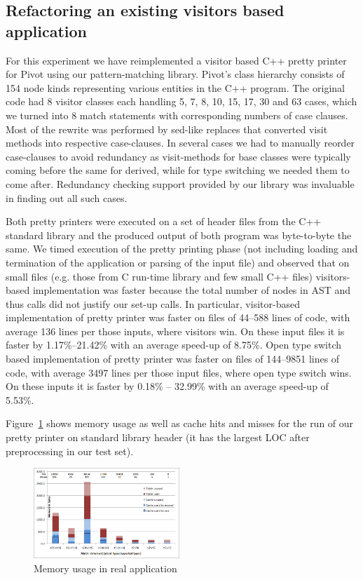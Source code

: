\subsection{Refactoring an existing visitors based application}
\label{sec:qualcmp}

For this experiment we have reimplemented a visitor based C++ pretty printer for 
Pivot\cite{Pivot09} using our pattern-matching library. Pivot's class hierarchy 
consists of 154 node kinds representing various entities in the C++ program. The 
original code had 8 visitor classes each handling 5, 7, 8, 10, 15, 17, 30 and 63 
cases, which we turned into 8 match statements with corresponding numbers of 
case clauses. Most of the rewrite was performed by sed-like replaces that 
converted visit methods into respective case-clauses. In several cases we had to 
manually reorder case-clauses to avoid redundancy as visit-methods for base classes 
were typically coming before the same for derived, while for type switching we 
needed them to come after. Redundancy checking support provided by our library 
was invaluable in finding out all such cases.

Both pretty printers were executed on a set of header files from the C++ 
standard library and the produced output of both program was byte-to-byte the same. 
We timed execution of the pretty printing phase (not including loading and termination 
of the application or parsing of the input file) and observed that on small 
files (e.g. those from C run-time library and few small C++ files) 
visitors-based implementation was faster because the total number of nodes in 
AST and thus calls did not justify our set-up calls. In particular, 
visitor-based implementation of pretty printer was faster on files of 44--588  
lines of code, with average 136 lines per those inputs, where visitors win. On 
these input files it is faster by 1.17\%--21.42\% with an average speed-up of 
8.75\%. Open type switch based implementation of pretty printer was faster on 
files of 144--9851 lines of code, with average 3497 lines per those input files, 
where open type switch wins. On these inputs it is faster by 0.18\% -- 32.99\% 
with an average speed-up of 5.53\%.

Figure~\ref{fig:mem} shows memory usage as well as cache hits and misses for 
the run of our pretty printer on  standard library 
header (it has the largest LOC after preprocessing in our test set).

\begin{figure}[htbp]
  \centering
    \includegraphics[width=0.49\textwidth]{Memory.png}
  \caption{Memory usage in real application}
  \label{fig:mem}
\end{figure}

